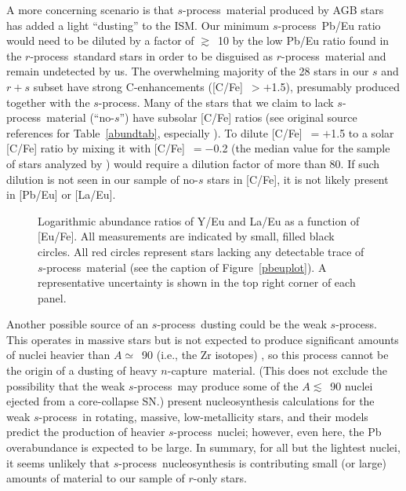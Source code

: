 \documentclass{emulateapj}
\def\rpro{\mbox{$r$-process}}
\def\spro{\mbox{$s$-process}}
\def\ncap{\mbox{$n$-capture}}
\begin{document}
A more concerning scenario is that 
\spro\ material produced by AGB stars has added a light ``dusting''
to the ISM.
Our minimum \spro\ Pb/Eu ratio would need to be diluted by a factor
of $\gtrsim$~10 by the low Pb/Eu ratio found in the \rpro\ standard
stars in order to be disguised as \rpro\ material and
remain undetected by us.
The overwhelming majority of the 28 stars in our 
$s$ and $r+s$ subset have strong C-enhancements
([C/Fe]~$> +$1.5), presumably produced together with the \spro.
Many of the stars that we claim to lack \spro\ material
(``no-$s$'') have subsolar [C/Fe] ratios
(see original source references for Table~\ref{abundtab}, 
especially \citealt{simmerer04}).
To dilute [C/Fe]~$= +$1.5 to a solar [C/Fe] ratio by mixing it
with [C/Fe]~$= -$0.2 (the median value for the sample of stars
analyzed by \citealt{simmerer04}) would 
require a dilution factor of more than 80.
If such dilution is not seen in our sample of no-$s$ stars in [C/Fe], 
it is not likely present in [Pb/Eu] or [La/Eu]. 

\begin{figure}
\begin{center}
\end{center}
\caption{
\label{resultplot1}
Logarithmic abundance ratios of 
Y/Eu and La/Eu as a function of [Eu/Fe].
All measurements are indicated by small, filled black circles.
All red circles represent stars lacking any detectable
trace of \spro\ material (see the caption of Figure~\ref{pbeuplot}).
A representative uncertainty is shown 
in the top right corner of each panel.
}
\end{figure}

Another possible source of an \spro\ dusting 
could be the weak \spro.
This operates in massive stars but is not expected to produce
significant amounts of nuclei heavier than 
$A \simeq$~90 (i.e., the Zr isotopes) \citep{raiteri93},
so this process cannot be the origin of a dusting 
of heavy \ncap\ material.
(This does not exclude the possibility that the weak \spro\ 
may produce some of the $A \lesssim$~90 nuclei 
ejected from a core-collapse SN.)
\citet{pignatari08} present nucleosynthesis calculations
for the weak \spro\ in rotating, massive, low-metallicity 
stars, and their models predict the production of 
heavier \spro\ nuclei; however, even here, the Pb overabundance
is expected to be large.  
In summary, for all but the lightest nuclei,
it seems unlikely that 
\spro\ nucleosynthesis is contributing 
small (or large) amounts of material to our sample of $r$-only stars.
\end{document}
